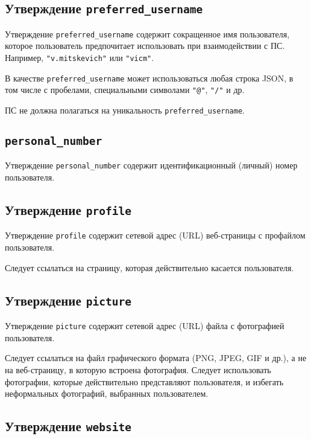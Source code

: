 \subsection{Утверждение \lstinline{preferred_username}}
\label{CLAIMS.PreferredUsername} 

Утверждение \lstinline{preferred_username} содержит сокращенное имя 
пользователя, которое пользователь предпочитает использовать при взаимодействии 
с ПС. Например, \lstinline{"v.mitskevich"} или \lstinline{"vicm"}.

В качестве \lstinline{preferred_username} может использоваться любая 
строка JSON, в том числе с пробелами, специальными символами 
\lstinline{"@"}, \lstinline{"/"} и др.

ПС не должна полагаться на уникальность \lstinline{preferred_username}.

\subsection{ 
\lstinline{personal_number}}\label{CLAIMS.PersonalNumber} 

Утверждение \lstinline{personal_number} содержит идентификационный (личный) 
номер пользователя. 

\subsection{Утверждение \lstinline{profile}}\label{CLAIMS.Profile}

Утверждение \lstinline{profile} содержит сетевой адрес (URL) веб-страницы
с профайлом пользователя. 

Следует ссылаться на страницу, которая действительно касается пользователя.

\subsection{Утверждение \lstinline{picture}}\label{CLAIMS.Picture}

Утверждение \lstinline{picture} содержит сетевой адрес (URL) файла с
фотографией пользователя.

Следует ссылаться на файл графического формата (PNG, JPEG, GIF и др.),
а не на веб-страницу, в которую встроена фотография.
%
Следует использовать фотографии, которые действительно представляют 
пользователя, и избегать неформальных фотографий, выбранных пользователем.

\subsection{Утверждение \lstinline{website}}\label{CLAIMS.Website}

